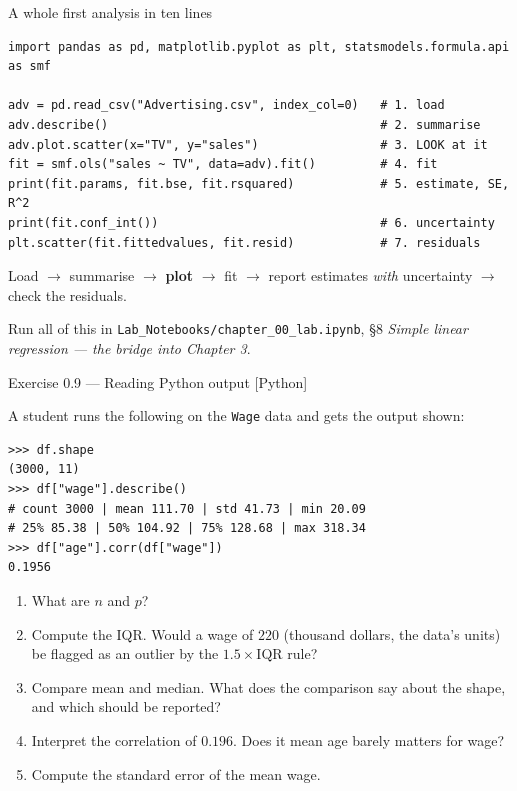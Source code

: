 \documentclass[aspectratio=169,11pt]{beamer}
\begin{document}
\begin{frame}[fragile]{A whole first analysis in ten lines}
\begin{lstlisting}
import pandas as pd, matplotlib.pyplot as plt, statsmodels.formula.api as smf

adv = pd.read_csv("Advertising.csv", index_col=0)   # 1. load
adv.describe()                                      # 2. summarise
adv.plot.scatter(x="TV", y="sales")                 # 3. LOOK at it
fit = smf.ols("sales ~ TV", data=adv).fit()         # 4. fit
print(fit.params, fit.bse, fit.rsquared)            # 5. estimate, SE, R^2
print(fit.conf_int())                               # 6. uncertainty
plt.scatter(fit.fittedvalues, fit.resid)            # 7. residuals
\end{lstlisting}
  \vspace{-4pt}
  \begin{takeaway}
    Load $\to$ summarise $\to$ \textbf{plot} $\to$ fit $\to$ report estimates
    \emph{with} uncertainty $\to$ check the residuals.
  \end{takeaway}
  \begin{labnote}
    Run all of this in \texttt{Lab\_Notebooks/chapter\_00\_lab.ipynb},
    \S8 \emph{Simple linear regression --- the bridge into Chapter 3}.
  \end{labnote}
\end{frame}

\begin{frame}[fragile]{Exercise 0.9 --- Reading Python output [Python]}
  \begin{exercise}
    \scriptsize
    A student runs the following on the \texttt{Wage} data and gets the
    output shown:
\begin{lstlisting}
>>> df.shape
(3000, 11)
>>> df["wage"].describe()
# count 3000 | mean 111.70 | std 41.73 | min 20.09
# 25% 85.38 | 50% 104.92 | 75% 128.68 | max 318.34
>>> df["age"].corr(df["wage"])
0.1956
\end{lstlisting}
    \begin{enumerate}
      \item What are $n$ and $p$?
      \item Compute the IQR. Would a wage of $220$ (thousand dollars, the
            data's units) be flagged as an outlier by the
            $1.5\times\mathrm{IQR}$ rule?
      \item Compare mean and median. What does the comparison say about the
            shape, and which should be reported?
      \item Interpret the correlation of $0.196$. Does it mean age barely
            matters for wage?
      \item Compute the standard error of the mean wage.
    \end{enumerate}
  \end{exercise}
\end{frame}
\end{document}
